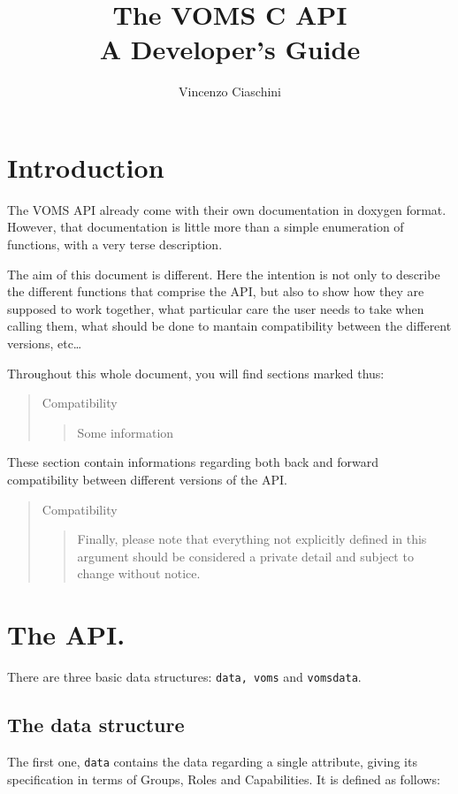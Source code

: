 \documentclass[a4paper]{book}
\newenvironment{compatibility}{\begin{quote}\color{red}Compatibility\begin{quote}}{\end{quote}\color{black}\end{quote}}
\begin{document}
\lstset{language=C}
\begin{titlepage}
\title{The VOMS C API\\ A Developer's Guide}
\author{Vincenzo Ciaschini}
\end{titlepage}
\maketitle
\tableofcontents
\newpage
\chapter{Introduction}
The VOMS API already come with their own documentation in doxygen
format.  However, that documentation is little more than a simple
enumeration of functions, with a very terse description.

The aim of this document is different.  Here the intention is not only
to describe the different functions that comprise the API, but also to
show how they are supposed to work together, what particular care the
user needs to take when calling them, what should be done to mantain
compatibility between the different versions, etc\ldots

Throughout this whole document, you will find sections marked thus:
\begin{compatibility}
Some information
\end{compatibility}
These section contain informations regarding both back and forward
compatibility between different versions of the API.

\begin{compatibility}
Finally, please note that everything not explicitly defined in this
argument should be considered a private detail and subject to change
without notice.
\end{compatibility}

\chapter{The API.}
There are three basic data structures: \verb|data, voms|
and \verb|vomsdata|.

\section{The data structure}
The first one, \verb|data| contains the data regarding a single
attribute, giving its specification in terms of Groups, Roles and
Capabilities. It is defined as follows:
\end{document}
